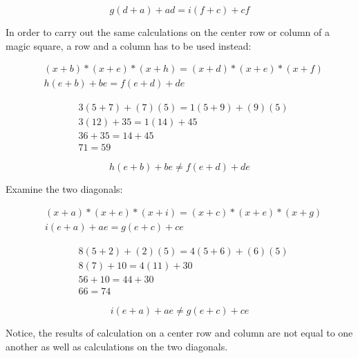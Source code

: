 \documentclass[a4paper]{article}
\begin{document}
\begin{equation}
g(d + a) + ad = i(f + c) + cf
\end{equation}

In order to carry out the same calculations on the center row or column of a magic square, a row and a column has to be used instead:

\begin{equation*} \begin{aligned}
& (x + b) * (x + e) * (x + h) = (x + d) * (x + e) * (x + f) \\
& h(e + b) + be = f(e + d) + de
\end{aligned} \end{equation*}

\begin{equation*} \begin{aligned}
& 3(5 + 7) + (7)(5) = 1(5 + 9) + (9)(5) \\
& 3(12) + 35 = 1(14) + 45 \\
& 36 + 35 = 14 + 45 \\
& 71 = 59
\end{aligned} \end{equation*}

\begin{equation}
h(e + b) + be \not = f(e + d) + de
\end{equation}

Examine the two diagonals:

\begin{equation*} \begin{aligned}
& (x + a) * (x + e) * (x + i) = (x + c) * (x + e) * (x + g) \\
& i(e + a) + ae = g(e + c) + ce
\end{aligned} \end{equation*}

\begin{equation*} \begin{aligned}
& 8(5 + 2) + (2)(5) = 4(5 + 6) + (6)(5) \\
& 8(7) + 10 = 4(11) + 30 \\
& 56 + 10 = 44 + 30 \\
& 66 = 74
\end{aligned} \end{equation*}

\begin{equation}
i(e + a) + ae \not = g(e + c) + ce
\end{equation}

Notice, the results of calculation on a center row and column are not equal to one another as well as calculations on the two diagonals.
\end{document}

